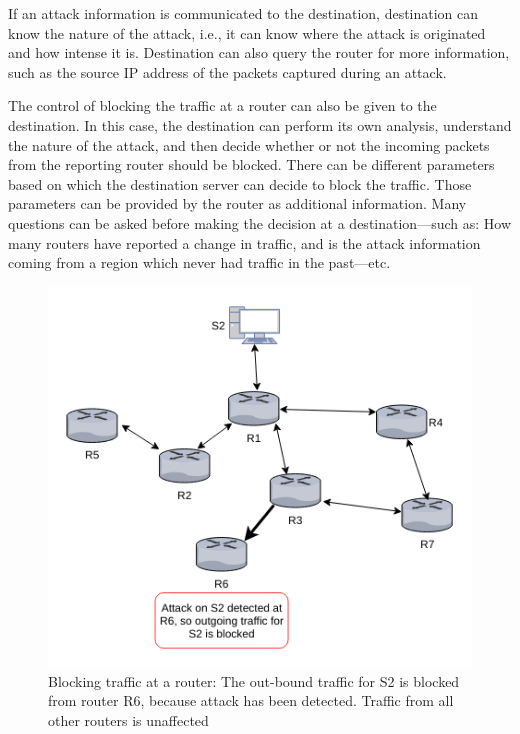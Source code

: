 \documentclass[12pt,oneside,a4paper]{article}
\begin{document}
If an attack information is communicated to the destination, destination can know the nature of the attack, i.e., it can know where the attack is originated and how intense it is. Destination can also query the router for more information, such as the source IP address of the packets captured during an attack.

The control of blocking the traffic at a router can also be given to the destination. In this case, the destination can perform its own analysis, understand the nature of the attack, and then decide whether or not the incoming packets from the reporting router should be blocked. There can be different parameters based on which the destination server can decide to block the traffic. Those parameters can be provided by the router as additional information. Many questions can be asked before making the decision at a destination---such as: How many routers have reported a change in traffic, and is the attack information coming from a region which never had traffic in the past---etc.

\begin{figure}[H]
\centering
\includegraphics[scale=0.60]{mitigation_path.png}
\caption{Blocking traffic at a router: The out-bound traffic for S2 is blocked from router R6,
because attack has been detected. Traffic from all other routers is unaffected} \label{fig:mitigation_path}
\end{figure}
\end{document}
